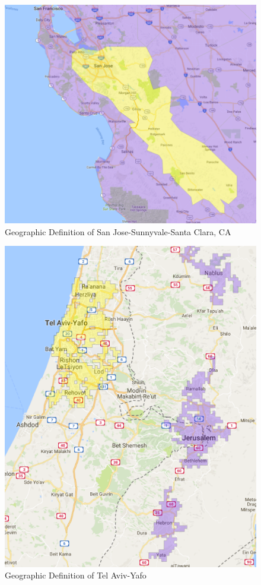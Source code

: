 \documentclass[12pt]{article}
\begin{document}
\begin{figure}[h]
\begin{centering}
  \includegraphics[width=\textwidth]{SanJose}
  \caption{Geographic Definition of San Jose-Sunnyvale-Santa Clara, CA}
   \label{fig:SanJose}
\end{centering}
\end{figure}

\begin{figure}[h]
\begin{centering}
  \includegraphics[width=\textwidth]{TelAviv}
  \caption{Geographic Definition of Tel Aviv-Yafo}
   \label{fig:TelAviv}
\end{centering}
\end{figure}


 

\end{document}

